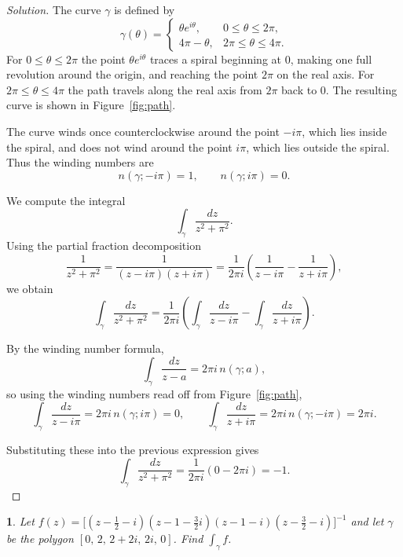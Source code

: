 \documentclass[12pt, a4paper]{report}
\theoremstyle{spaced}
\newtheorem{exercise}{}
\newcommand{\setexercise}[1]{\setcounter{exercise}{#1-1}}
\begin{document}
\begin{proof}[Solution]
	The curve $\gamma$ is defined by
	\[
		\gamma(\theta)=
		\begin{cases}
			\theta e^{i\theta}, & 0\le \theta \le 2\pi,     \\[4pt]
			4\pi-\theta,        & 2\pi \le \theta \le 4\pi.
		\end{cases}
	\]
	For $0\le\theta\le 2\pi$ the point $\theta e^{i\theta}$ traces a spiral beginning at $0$,
	making one full revolution around the origin, and reaching the point $2\pi$ on the real axis.
	For $2\pi\le\theta\le 4\pi$ the path travels along the real axis from $2\pi$ back to $0$.
	The resulting curve is shown in Figure~\ref{fig:path}.

	\medskip
	The curve winds once counterclockwise
	around the point $-i\pi$, which lies inside the spiral,
	and does not wind around the point $i\pi$, which lies outside the spiral.
	Thus the winding numbers are
	\[
		n(\gamma;-i\pi)=1,
		\qquad
		n(\gamma;i\pi)=0.
	\]

	We compute the integral
	\[
		\int_\gamma \frac{dz}{z^{2}+\pi^{2}}.
	\]
	Using the partial fraction decomposition
	\[
		\frac{1}{z^{2}+\pi^{2}}
		=\frac{1}{(z-i\pi)(z+i\pi)}
		=\frac{1}{2\pi i} \left( \frac{1}{z-i\pi} - \frac{1}{z+i\pi} \right),
	\]
	we obtain
	\[
		\int_\gamma \frac{dz}{z^{2}+\pi^{2}}
		=
		\frac{1}{2\pi i}
		\left(
		\int_\gamma \frac{dz}{z-i\pi}
		-
		\int_\gamma \frac{dz}{z+i\pi}
		\right).
	\]

	By the winding number formula,
	\[
		\int_\gamma \frac{dz}{z-a}
		=
		2\pi i\, n(\gamma;a),
	\]
	so using the winding numbers read off from Figure~\ref{fig:path},
	\[
		\int_\gamma \frac{dz}{z-i\pi}
		=2\pi i\,n(\gamma;i\pi)=0,
		\qquad
		\int_\gamma \frac{dz}{z+i\pi}
		=2\pi i\,n(\gamma;-i\pi)=2\pi i.
	\]

	Substituting these into the previous expression gives
	\[
		\int_\gamma \frac{dz}{z^{2}+\pi^{2}}
		=
		\frac{1}{2\pi i}(0-2\pi i)
		= -1.
	\]
\end{proof}


\setexercise{7}
\begin{exercise}
	Let
	\(
	f(z) = \big[(z - \tfrac{1}{2} - i)(z - 1 - \tfrac{3}{2}i)(z - 1 - i)(z - \tfrac{3}{2} - i)\big]^{-1}
	\)
	and let $\gamma$ be the polygon $[0,\, 2,\, 2+2i,\, 2i,\, 0]$.
	Find $\displaystyle \int_{\gamma} f$.
\end{exercise}
\end{document}

